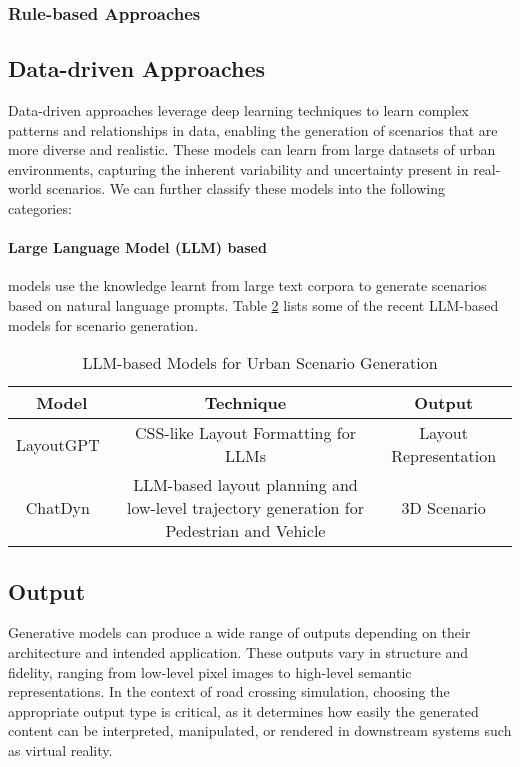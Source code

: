 \documentclass{article}
\begin{document}
\begin{table}[ht]
\subsubsection{Rule-based Approaches}

\subsection{Data-driven Approaches}

Data-driven  approaches leverage deep learning techniques to learn complex patterns and relationships in data, enabling the generation of scenarios that are more diverse and realistic. These models can learn from large datasets of urban environments, capturing the inherent variability and uncertainty present in real-world scenarios. We can further classify these models into the following categories:

\paragraph{Large Language Model (LLM) based} models use the knowledge learnt from large text corpora to generate scenarios based on natural language prompts. Table \ref{tab:llm_based_models} lists some of the recent LLM-based models for scenario generation.

\begin{table}[ht]
    \centering
    \begin{tabular}{|c|c|c|}
        \hline
        \textbf{Model} & \textbf{Technique} & \textbf{Output} \\ \hline        
        LayoutGPT~\cite{feng2023layoutgpt} & CSS-like Layout Formatting for LLMs & Layout Representation \\ \hline
        ChatDyn~\cite{wei2024chatdyn} & LLM-based layout planning and low-level trajectory generation for Pedestrian and Vehicle & 3D Scenario \\ 

    \end{tabular}
    \caption{LLM-based Models for Urban Scenario Generation}
    \label{tab:llm_based_models}
\end{table}

\subsection{Output}

Generative models can produce a wide range of outputs depending on their architecture and intended application. These outputs vary in structure and fidelity, ranging from low-level pixel images to high-level semantic representations. In the context of road crossing simulation, choosing the appropriate output type is critical, as it determines how easily the generated content can be interpreted, manipulated, or rendered in downstream systems such as virtual reality.


\end{table}
\end{document}
